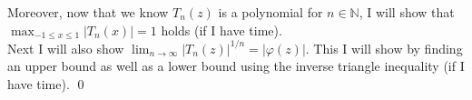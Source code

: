 \documentclass[10pt]{amsart}
\theoremstyle{nonumberplain}
\begin{document}
\begin{enumerate}[label={\bf {\arabic*}:}]
\noindent
Moreover, now that we know $T_n(z)$ is a polynomial for $n \in \mathbb N$, I will show that $\max_{-1 \leq x \leq 1} |T_n(x)| = 1$ holds (if I have time).
\\

\noindent
Next I will also show $\lim_{n \to \infty} |T_n(z)|^{1/n} = |\varphi(z)|$. This I will show by finding an upper bound as well as a lower bound using the inverse triangle inequality (if I have time).
\qed
\end{enumerate}
\end{document}
